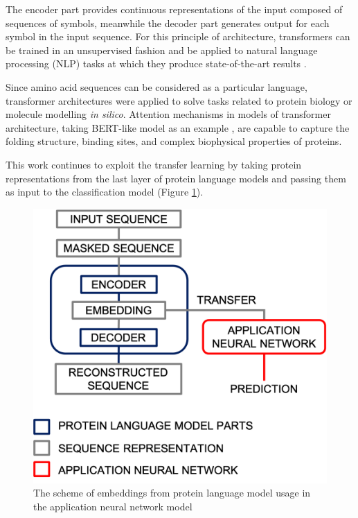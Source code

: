 \documentclass[12pt]{article}
\begin{document}
	The encoder part provides continuous representations of the input composed 
	of sequences of symbols, meanwhile the decoder part generates output for each 
	symbol in the input sequence. For this principle of architecture, transformers
	can be trained in an unsupervised fashion and be applied to natural language
	processing (NLP) tasks at which they produce state-of-the-art 
	results \cite{vig2019analyzing}.

	Since amino acid sequences can be considered as a particular language, 
	transformer architectures were applied to solve tasks related to protein 
	biology or molecule modelling \textit{in silico}. Attention mechanisms in 
	models of transformer architecture, taking BERT-like model as an example 
	\cite{vig2020bertology}, are capable to capture the folding structure, 
	binding sites, and complex biophysical properties of proteins.

	This work continues to exploit the transfer learning by taking 
	protein representations from the last layer of protein language 
	models and passing them as input to the classification 
	model (Figure \ref{figure:EmbeddingsUsageScheme}).

	\begin{figure}[h!]
		\centering
		\includegraphics[scale=0.4]{scheme.png}

		\caption{The scheme of embeddings from protein language model usage in the 
		application neural network model}
		\label{figure:EmbeddingsUsageScheme}
	\end{figure}
\end{document}
